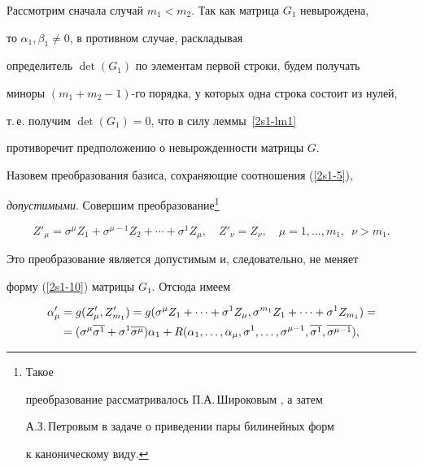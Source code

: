 Рассмотрим сначала случай $m_1 < m_2$. Так как матрица $G_1$ невырождена,


то $\alpha_1,\beta_1 \neq 0$, в противном случае, раскладывая


определитель $\det (G_1)$ по элементам первой строки, будем получать


миноры $(m_1+m_2-1)$-го порядка, у которых одна строка состоит из нулей,


т.\,е.{} получим $\det (G_1) = 0$, что в силу леммы~\ref{2s1-lm1}


противоречит предположению о невырожденности матрицы $G$.


\addtocounter{footnote}{-1}





Назовем преобразования базиса, сохраняющие соотношения (\ref{2s1-5}),


{\it допустимыми}. Совершим преобразование\footnote{Такое


преобразование рассматривалось П.А.\,Широковым \cite{shir2}, а затем


А.З.\,Петровым \cite{pet1} в задаче о приведении пары билинейных форм


к каноническому виду.}


$$


Z'_\mu = \sigma^\mu Z_1 + \sigma^{\mu - 1}


Z_2 + \dotsb + \sigma^1 Z_\mu, \quad Z'_\nu = Z_\nu,


\quad \mu = 1,\dotsc,m_1, \ \; \nu > m_1.


$$


Это преобразование является допустимым и, следовательно, не меняет


форму (\ref{2s1-10}) матрицы $G_1$. Отсюда имеем


\begin{multline}


\label{2-12bis}


\alpha'_\mu = g(Z'_\mu,Z'_{m_1}) = g(\sigma^\mu Z_1 + \dotsb +


\sigma^1 Z_\mu, \sigma^{m_1} Z_1 +\dotsb+ \sigma^1 Z_{m_1}) =\\


=(\sigma^\mu\ol{\sigma^1}+\sigma^1\ol{\sigma^\mu})\alpha_1 +


R(\alpha_1,\dotsc,\alpha_\mu,\sigma^1,\dotsc,\sigma^{\mu-1},\ol{\sigma^1},


\ol{\sigma^{\mu-1}}),


\end{multline}


